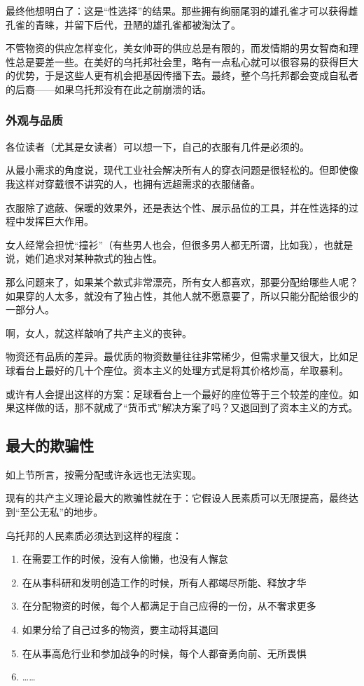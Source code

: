最终他想明白了：这是“性选择”的结果。那些拥有绚丽尾羽的雄孔雀才可以获得雌孔雀的青睐，并留下后代，丑陋的雄孔雀都被淘汰了。

\zPar

不管物资的供应怎样变化，美女帅哥的供应总是有限的，而发情期的男女智商和理性总是要差一些。在美好的乌托邦社会里，略有一点私心就可以很容易的获得巨大的优势，于是这些人更有机会把基因传播下去。最终，整个乌托邦都会变成自私者的后裔——如果乌托邦没有在此之前崩溃的话。

\subsubsection{外观与品质}

各位读者（尤其是女读者）可以想一下，自己的衣服有几件是必须的。

从最小需求的角度说，现代工业社会解决所有人的穿衣问题是很轻松的。但即使像我这样对穿戴很不讲究的人，也拥有远超需求的衣服储备。

衣服除了遮蔽、保暖的效果外，还是表达个性、展示品位的工具，并在性选择的过程中发挥巨大作用。

\zPar

女人经常会担忧“撞衫”（有些男人也会，但很多男人都无所谓，比如我），也就是说，她们追求对某种款式的独占性。

那么问题来了，如果某个款式非常漂亮，所有女人都喜欢，那要分配给哪些人呢？如果穿的人太多，就没有了独占性，其他人就不愿意要了，所以只能分配给很少的一部分人。

啊，女人，就这样敲响了共产主义的丧钟。

\zPar

物资还有品质的差异。最优质的物资数量往往非常稀少，但需求量又很大，比如足球看台上最好的几十个座位。资本主义的处理方式是将其价格炒高，牟取暴利。

或许有人会提出这样的方案：足球看台上一个最好的座位等于三个较差的座位。如果这样做的话，那不就成了“货币式”解决方案了吗？又退回到了资本主义的方式。

\subsection{最大的欺骗性}
如上节所言，按需分配或许永远也无法实现。

现有的共产主义理论最大的欺骗性就在于：它假设人民素质可以无限提高，最终达到“至公无私”的地步。

乌托邦的人民素质必须达到这样的程度：

\begin{enumerate}
\item 在需要工作的时候，没有人偷懒，也没有人懈怠
\item 在从事科研和发明创造工作的时候，所有人都竭尽所能、释放才华
\item 在分配物资的时候，每个人都满足于自己应得的一份，从不奢求更多
\item 如果分给了自己过多的物资，要主动将其退回
\item 在从事高危行业和参加战争的时候，每个人都奋勇向前、无所畏惧
\item ……
\end{enumerate}


